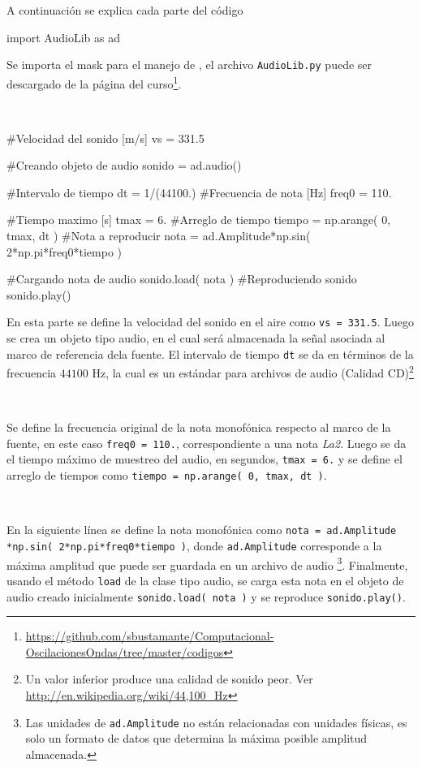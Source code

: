 A continuación se explica cada parte del código


\begin{listing}[style=python, numbers = none]
import AudioLib as ad
\end{listing}
Se importa el mask para el manejo de \pyaudio, el archivo \texttt{AudioLib.py}
puede ser descargado de la página del curso\footnote{\url{https://github.com/sbustamante/Computacional-OscilacionesOndas/tree/master/codigos}}.

\
\begin{listing}[style=python, numbers = none]
#Velocidad del sonido [m/s]
vs = 331.5

#Creando objeto de audio
sonido = ad.audio()

#Intervalo de tiempo
dt = 1/(44100.)
#Frecuencia de nota [Hz]
freq0 = 110.

#Tiempo maximo	[s]
tmax = 6.
#Arreglo de tiempo
tiempo = np.arange( 0, tmax, dt )
#Nota a reproducir
nota = ad.Amplitude*np.sin( 2*np.pi*freq0*tiempo )

#Cargando nota de audio
sonido.load( nota )
#Reproduciendo sonido
sonido.play()
\end{listing}
En esta parte se define la velocidad del sonido en el aire como 
\texttt{vs = 331.5}. Luego se crea un objeto tipo audio, en el cual será 
almacenada la señal asociada al marco de referencia dela fuente. El intervalo
de tiempo \texttt{dt} se da en términos de la frecuencia $44100$ Hz, la cual
es un estándar para archivos de audio (Calidad CD)\footnote{Un valor inferior
produce una calidad de sonido peor. Ver \url{http://en.wikipedia.org/wiki/44,100_Hz}}

\

Se define la frecuencia original de la nota monofónica respecto al marco
de la fuente, en este caso \texttt{freq0 = 110.}, correspondiente a 
una nota \textit{La2}. Luego se da el tiempo máximo de muestreo del audio,
en segundos, \texttt{tmax = 6.} y se define el arreglo de tiempos como
\texttt{tiempo = np.arange( 0, tmax, dt )}.

\

En la siguiente línea se define la nota monofónica como \texttt{nota = 
ad.Amplitude}
\texttt{*np.sin( 2*np.pi*freq0*tiempo )}, donde \texttt{ad.Amplitude}
corresponde a la máxima amplitud que puede ser guardada en un archivo 
de audio \footnote{Las unidades de \texttt{ad.Amplitude} no están 
relacionadas con unidades físicas, es solo un formato de datos que 
determina la máxima posible amplitud almacenada.}. Finalmente, usando
el método \texttt{load} de la clase tipo audio, se carga esta nota en el
objeto de audio creado inicialmente \texttt{sonido.load( nota )} y se 
reproduce \texttt{sonido.play()}.

